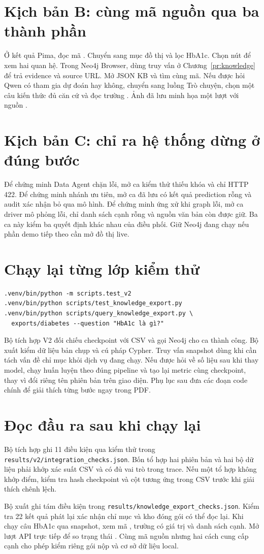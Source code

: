 \section{Kịch bản B: cùng mã nguồn qua ba thành phần}
Ở kết quả Pima, đọc mã . Chuyển sang mục đồ thị và lọc HbA1c. Chọn nút để xem hai quan hệ. Trong Neo4j Browser, dùng truy vấn ở Chương~\ref{pr:knowledge} để trả evidence và source URL. Mở JSON KB và tìm cùng mã. Nếu được hỏi Qwen có tham gia dự đoán hay không, chuyển sang luồng Trò chuyện, chọn một câu kiến thức đủ căn cứ và đọc trường . Ảnh đã lưu minh họa một lượt  với nguồn .

\section{Kịch bản C: chỉ ra hệ thống dừng ở đúng bước}
Để chứng minh Data Agent chặn lỗi, mở ca kiểm thử thiếu khóa và chỉ HTTP 422. Để chứng minh nhánh ưu tiên, mở ca đã lưu có kết quả prediction rỗng và audit xác nhận bỏ qua mô hình. Để chứng minh ứng xử khi graph lỗi, mở ca driver mô phỏng lỗi, chỉ danh sách cạnh rỗng và nguồn văn bản còn được giữ. Ba ca này kiểm ba quyết định khác nhau của điều phối. Giữ Neo4j đang chạy nếu phần demo tiếp theo cần mở đồ thị live.

\section{Chạy lại từng lớp kiểm thử}
\begin{Verbatim}[fontsize=\small]
.venv/bin/python -m scripts.test_v2
.venv/bin/python scripts/test_knowledge_export.py
.venv/bin/python scripts/query_knowledge_export.py \
  exports/diabetes --question "HbA1c là gì?"
\end{Verbatim}

Bộ tích hợp V2 đối chiếu checkpoint với CSV và gọi Neo4j cho ca thành công. Bộ xuất kiểm dữ liệu bản chụp và cú pháp Cypher. Truy vấn snapshot dùng khi cần tách vấn đề chỉ mục khỏi dịch vụ đang chạy. Nếu được hỏi về số liệu sau khi thay model, chạy huấn luyện theo đúng pipeline và tạo lại metric cùng checkpoint, thay vì đổi riêng tên phiên bản trên giao diện. Phụ lục sau đưa các đoạn code chính để giải thích từng bước ngay trong PDF.

\section{Đọc đầu ra sau khi chạy lại}
Bộ tích hợp ghi 11 điều kiện qua kiểm thử trong \nolinkurl{results/v2/integration_checks.json}. Bốn tổ hợp hai phiên bản và hai bộ dữ liệu phải khớp xác suất CSV và có đủ vai trò trong trace. Nếu một tổ hợp không khớp điểm, kiểm tra hash checkpoint và cột tương ứng trong CSV trước khi giải thích chênh lệch.

Bộ xuất ghi tám điều kiện trong \nolinkurl{results/knowledge_export_checks.json}. Kiểm tra 22 kết quả phát lại xác nhận chỉ mục và kho đóng gói có thể đọc lại. Khi chạy câu HbA1c qua snapshot, xem mã , trường  có giá trị  và danh sách cạnh. Mở lượt API trực tiếp để so trạng thái . Cùng mã nguồn nhưng hai cách cung cấp cạnh cho phép kiểm riêng gói nộp và cơ sở dữ liệu local.
